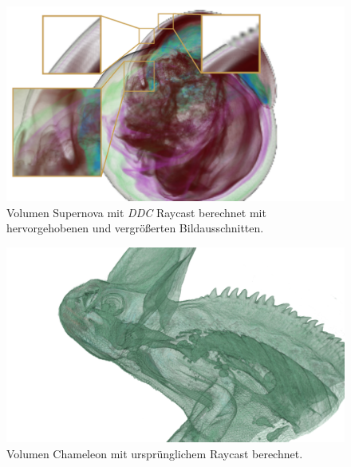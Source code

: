\begin{landscape}
	\begin{figure}
		\centering
		\includegraphics[width=\textheight]{../../Grafiken/results/picture_quality/supernova/DDC_img-1_ray-1-5_edited.png}
		\caption{Volumen Supernova mit \emph{DDC} Raycast berechnet mit hervorgehobenen und vergrößerten Bildausschnitten.}
		\label{fig::res::sup_ddc}
	\end{figure}
\end{landscape}

\iffalse
\begin{landscape}
	\begin{figure}
		\centering
		\includegraphics[width=1\textheight]{../../Grafiken/results/picture_quality/chameleon/Standard_img-1_Ray-1-5.png}
		\caption{Volumen Chameleon mit ursprünglichem Raycast berechnet.}
		\label{fig::res::cam_st}
	\end{figure}
\end{landscape}

